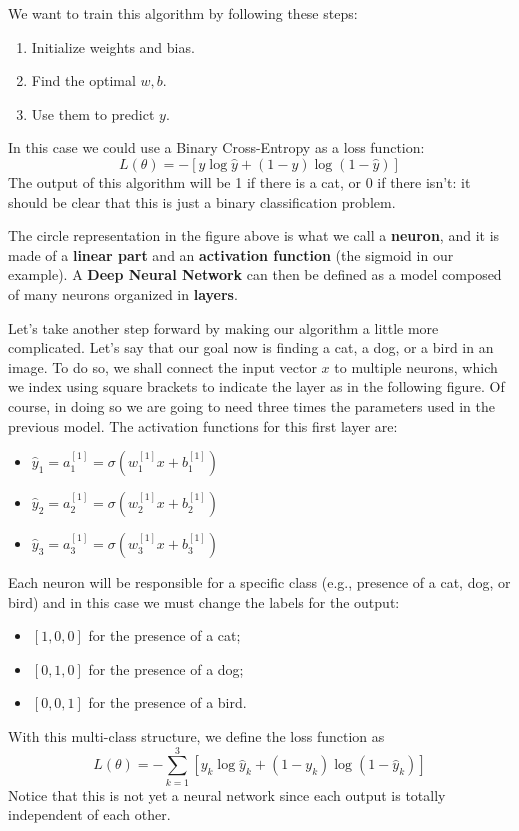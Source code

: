We want to train this algorithm by following these steps:
\begin{enumerate}
    \item[-] Initialize weights and bias.
    \item[-] Find the optimal $w, b$.
    \item[-] Use them to predict $y$.
\end{enumerate}
In this case we could use a Binary Cross-Entropy as a loss function: 
\begin{equation}
    L(\theta) = -[y \log \hat{y} + (1-y)\log(1-\hat{y})]
\end{equation}
The output of this algorithm will be 1 if there is a cat, or 0 if there isn't: it should be clear that this is just a binary classification problem.

The circle representation in the figure above is what we call a \textbf{neuron}, and it is made of a \textbf{linear part} and an \textbf{activation function} (the sigmoid in our example). A \textbf{Deep Neural Network} can then be defined as a model composed of many neurons organized in \textbf{layers}.

Let's take another step forward by making our algorithm a little more complicated. Let's say that our goal now is finding a cat, a dog, or a bird in an image. To do so, we shall connect the input vector $x$ to multiple neurons, which we index using square brackets to indicate the layer as in the following figure. Of course, in doing so we are going to need three times the parameters used in the previous model. The activation functions for this first layer are:
\begin{itemize}
    \item[-] $\hat{y}_1 = a_1^{[1]} = \sigma(w_1^{[1]}x + b_1^{[1]})$
    \item[-] $\hat{y}_2 = a_2^{[1]} = \sigma(w_2^{[1]}x + b_2^{[1]})$
    \item[-] $\hat{y}_3 = a_3^{[1]} = \sigma(w_3^{[1]}x + b_3^{[1]})$
\end{itemize}
Each neuron will be responsible for a specific class (e.g., presence of a cat, dog, or bird) and in this case we must change the labels for the output:
\begin{itemize}
    \item[-] $[1, 0, 0]$ for the presence of a cat;
    \item[-] $[0, 1, 0]$ for the presence of a dog;
    \item[-] $[0, 0, 1]$ for the presence of a bird.
\end{itemize}
With this multi-class structure, we define the loss function as 
\begin{equation}\label{eq:4.17}
    L(\theta) = -\sum_{k=1}^{3}[y_k \log \hat{y}_k + (1-y_k)\log(1-\hat{y}_k)]
\end{equation} 
Notice that this is not yet a neural network since each output is totally independent of each other. 

